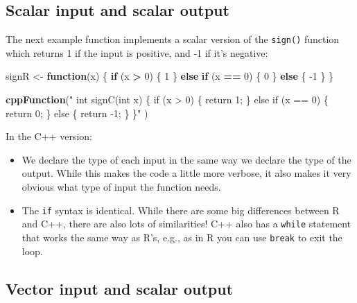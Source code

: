 \documentclass[
]{krantz}
\makeatletter
\newenvironment{Shaded}{\begin{snugshade}}{\end{snugshade}}
\newcommand{\ControlFlowTok}[1]{\textcolor[rgb]{0.27,0.27,0.27}{\textbf{#1}}}
\newcommand{\DecValTok}[1]{\textcolor[rgb]{0.06,0.06,0.06}{#1}}
\newcommand{\KeywordTok}[1]{\textcolor[rgb]{0.27,0.27,0.27}{\textbf{#1}}}
\newcommand{\NormalTok}[1]{#1}
\newcommand{\OperatorTok}[1]{\textcolor[rgb]{0.43,0.43,0.43}{\textbf{#1}}}
\newcommand{\StringTok}[1]{\textcolor[rgb]{0.5,0.5,0.5}{#1}}
\newenvironment{kframe}{%
\medskip{}
\setlength{\fboxsep}{.8em}
 \def\at@end@of@kframe{}%
 \ifinner\ifhmode%
  \def\at@end@of@kframe{\end{minipage}}%
  \begin{minipage}{\columnwidth}%
 \fi\fi%
 \def\FrameCommand##1{\hskip\@totalleftmargin \hskip-\fboxsep
 \colorbox{shadecolor}{##1}\hskip-\fboxsep
     \hskip-\linewidth \hskip-\@totalleftmargin \hskip\columnwidth}%
 \MakeFramed {\advance\hsize-\width
   \@totalleftmargin\z@ \linewidth\hsize
   \@setminipage}}%
 {\par\unskip\endMakeFramed%
 \at@end@of@kframe}
\renewenvironment{Shaded}{\begin{kframe}}{\end{kframe}}
\makeatother
\begin{document}
\hypertarget{scalar-input-and-scalar-output}{%
\subsection{Scalar input and scalar output}\label{scalar-input-and-scalar-output}}

The next example function implements a scalar version of the \texttt{sign()} function which returns 1 if the input is positive, and -1 if it's negative:

\begin{Shaded}
\begin{Highlighting}[]
\NormalTok{signR \textless{}{-}}\StringTok{ }\ControlFlowTok{function}\NormalTok{(x) \{}
    \ControlFlowTok{if}\NormalTok{ (x }\OperatorTok{\textgreater{}}\StringTok{ }\DecValTok{0}\NormalTok{) \{}
        \DecValTok{1}
\NormalTok{    \} }\ControlFlowTok{else} \ControlFlowTok{if}\NormalTok{ (x }\OperatorTok{==}\StringTok{ }\DecValTok{0}\NormalTok{) \{}
        \DecValTok{0}
\NormalTok{    \} }\ControlFlowTok{else}\NormalTok{ \{}
        \DecValTok{{-}1}
\NormalTok{    \}}
\NormalTok{\}}

\KeywordTok{cppFunction}\NormalTok{(}\StringTok{"}
\StringTok{  int signC(int x) \{}
\StringTok{    if (x \textgreater{} 0) \{}
\StringTok{      return 1;}
\StringTok{    \} else if (x == 0) \{}
\StringTok{      return 0;}
\StringTok{    \} else \{}
\StringTok{      return {-}1;}
\StringTok{    \}}
\StringTok{  \}"}
\NormalTok{)}
\end{Highlighting}
\end{Shaded}

In the C++ version:

\begin{itemize}
\item
  We declare the type of each input in the same way we declare the type of the output. While this makes the code a little more verbose, it also makes it very obvious what type of input the function needs.
\item
  The \texttt{if} syntax is identical. While there are some big differences between R and C++, there are also lots of similarities! C++ also has a \texttt{while} statement that works the same way as R's, e.g., as in R you can use \texttt{break} to exit the loop.
\end{itemize}

\hypertarget{vector-input-and-scalar-output}{%
\subsection{Vector input and scalar output}\label{vector-input-and-scalar-output}}
\end{document}
